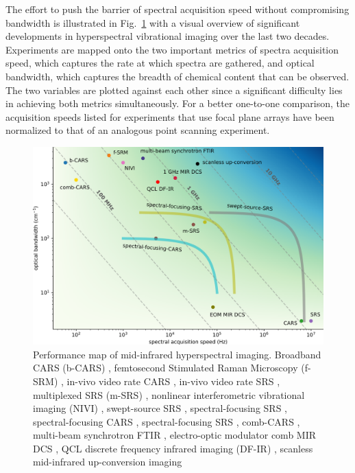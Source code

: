 \documentclass{optica-article}
\begin{document}
The effort to push the barrier of spectral acquisition speed without compromising bandwidth is illustrated in \mbox{Fig. \ref{fig:bckgnd}} with a visual overview of significant developments in hyperspectral vibrational imaging over the last two decades. Experiments are mapped onto the two important metrics of spectra acquisition speed, which captures the rate at which spectra are gathered, and optical bandwidth, which captures the breadth of chemical content that can be observed. The two variables are plotted against each other since a significant difficulty lies in achieving both metrics simultaneously. For a better one-to-one comparison, the acquisition speeds listed for experiments that use focal plane arrays have been normalized to that of an analogous point scanning experiment.


\begin{figure}[h]
    \centering
    \includegraphics[width=\linewidth]{bckgnd_with_cm_v3.png}
    \caption{Performance map of mid-infrared hyperspectral imaging. Broadband CARS (b-CARS) \cite{keeSimpleApproachOnelaser2004}, femtosecond Stimulated Raman Microscopy (f-SRM) \cite{ploetzFemtosecondStimulatedRaman2007}, in-vivo video rate CARS \cite{evansChemicalImagingTissue2005}, in-vivo video rate SRS \cite{saarVideoRateMolecularImaging2010}, multiplexed SRS (m-SRS) \cite{fuQuantitativeChemicalImaging2012,liaoMicrosecondScaleVibrational2015}, nonlinear interferometric vibrational imaging (NIVI) \cite{chowdaryMolecularHistopathologySpectrally2010}, swept-source SRS \cite{ozekiHighspeedMolecularSpectral2012}, spectral-focusing SRS \cite{fuHyperspectralImagingStimulated2013}, spectral-focusing CARS \cite{dinapoliHyperspectralDifferentialCARS2014}, spectral-focusing SRS \cite{linMicrosecondFingerprintStimulated2021}, comb-CARS \cite{ideguchiCoherentRamanSpectroimaging2013}, multi-beam synchrotron FTIR \cite{nasseHighresolutionFouriertransformInfrared2011}, electro-optic modulator comb MIR DCS \cite{ullahkhanDirectHyperspectralDualcomb2020}, QCL discrete frequency infrared imaging (DF-IR) \cite{yehFastInfraredChemical2015}, scanless mid-infrared up-conversion imaging \cite{zhaoHighspeedScanlessEntire2023}}
    \label{fig:bckgnd}
\end{figure}
\end{document}
